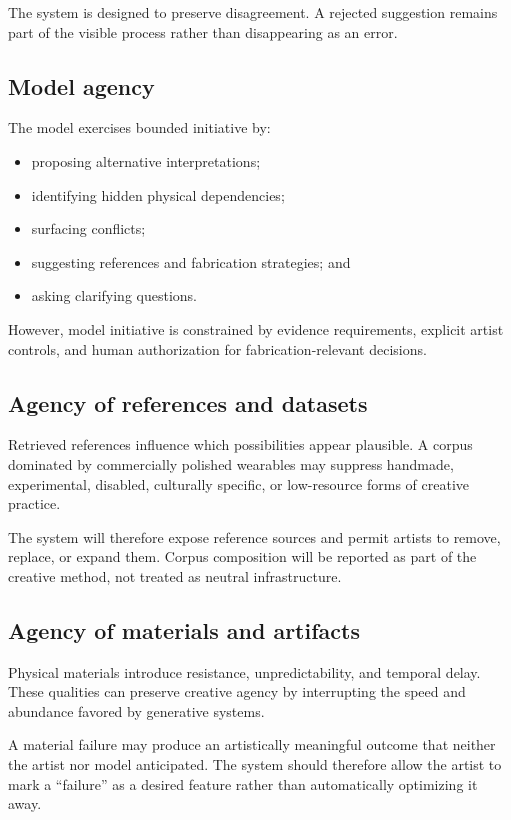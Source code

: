 \documentclass{article}
\begin{document}
The system is designed to preserve disagreement. A rejected suggestion remains
part of the visible process rather than disappearing as an error.

\subsection{Model agency}

The model exercises bounded initiative by:

\begin{itemize}[leftmargin=*]
    \item proposing alternative interpretations;
    \item identifying hidden physical dependencies;
    \item surfacing conflicts;
    \item suggesting references and fabrication strategies; and
    \item asking clarifying questions.
\end{itemize}

However, model initiative is constrained by evidence requirements, explicit
artist controls, and human authorization for fabrication-relevant decisions.

\subsection{Agency of references and datasets}

Retrieved references influence which possibilities appear plausible. A corpus
dominated by commercially polished wearables may suppress handmade,
experimental, disabled, culturally specific, or low-resource forms of creative
practice.

The system will therefore expose reference sources and permit artists to remove,
replace, or expand them. Corpus composition will be reported as part of the
creative method, not treated as neutral infrastructure.

\subsection{Agency of materials and artifacts}

Physical materials introduce resistance, unpredictability, and temporal delay.
These qualities can preserve creative agency by interrupting the speed and
abundance favored by generative systems.

A material failure may produce an artistically meaningful outcome that neither
the artist nor model anticipated. The system should therefore allow the artist
to mark a ``failure'' as a desired feature rather than automatically optimizing
it away.
\end{document}
